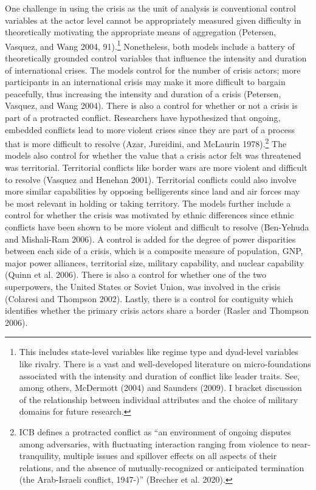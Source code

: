 \documentclass[
]{article}
\begin{document}
One challenge in using the crisis as the unit of analysis is conventional control variables at the actor level cannot be appropriately measured given difficulty in theoretically motivating the appropriate means of aggregation (Petersen, Vasquez, and Wang 2004, 91).\footnote{This includes state-level variables like regime type and dyad-level variables like rivalry. There is a vast and well-developed literature on micro-foundations associated with the intensity and duration of conflict like leader traits. See, among others, McDermott (2004) and Saunders (2009). I bracket discussion of the relationship between individual attributes and the choice of military domains for future research.} Nonetheless, both models include a battery of theoretically grounded control variables that influence the intensity and duration of international crises. The models control for the number of crisis actors; more participants in an international crisis may make it more difficult to bargain peacefully, thus increasing the intensity and duration of a crisis (Petersen, Vasquez, and Wang 2004). There is also a control for whether or not a crisis is part of a protracted conflict. Researchers have hypothesized that ongoing, embedded conflicts lead to more violent crises since they are part of a process that is more difficult to resolve (Azar, Jureidini, and McLaurin 1978).\footnote{ICB defines a protracted conflict as ``an environment of ongoing disputes among adversaries, with fluctuating interaction ranging from violence to near-tranquility, multiple issues and spillover effects on all aspects of their relations, and the absence of mutually-recognized or anticipated termination (the Arab-Israeli conflict, 1947-)'' (Brecher et al. 2020).} The models also control for whether the value that a crisis actor felt was threatened was territorial. Territorial conflicts like border wars are more violent and difficult to resolve (Vasquez and Henehan 2001). Territorial conflicts could also involve more similar capabilities by opposing belligerents since land and air forces may be most relevant in holding or taking territory. The models further include a control for whether the crisis was motivated by ethnic differences since ethnic conflicts have been shown to be more violent and difficult to resolve (Ben-Yehuda and Mishali-Ram 2006). A control is added for the degree of power disparities between each side of a crisis, which is a composite measure of population, GNP, major power alliances, territorial size, military capability, and nuclear capability (Quinn et al. 2006). There is also a control for whether one of the two superpowers, the United States or Soviet Union, was involved in the crisis (Colaresi and Thompson 2002). Lastly, there is a control for contiguity which identifies whether the primary crisis actors share a border (Rasler and Thompson 2006).
\end{document}
